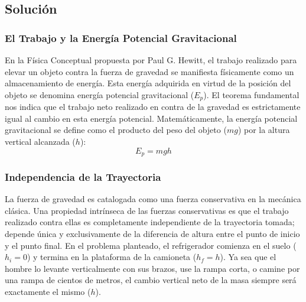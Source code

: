 \documentclass[a4paper,12pt]{article}
\begin{document}
\begin{center}
\end{center}

\subsection*{Solución}

\subsubsection*{El Trabajo y la Energía Potencial Gravitacional}
En la Física Conceptual propuesta por Paul G. Hewitt, el trabajo realizado para elevar un objeto contra la fuerza de gravedad se manifiesta físicamente como un almacenamiento de energía. Esta energía adquirida en virtud de la posición del objeto se denomina energía potencial gravitacional ($E_p$). El teorema fundamental nos indica que el trabajo neto realizado en contra de la gravedad es estrictamente igual al cambio en esta energía potencial. 
Matemáticamente, la energía potencial gravitacional se define como el producto del peso del objeto ($mg$) por la altura vertical alcanzada ($h$):
$$E_p = mgh$$

\subsubsection*{Independencia de la Trayectoria}
La fuerza de gravedad es catalogada como una fuerza conservativa en la mecánica clásica. Una propiedad intrínseca de las fuerzas conservativas es que el trabajo realizado contra ellas es completamente independiente de la trayectoria tomada; depende única y exclusivamente de la diferencia de altura entre el punto de inicio y el punto final. 
En el problema planteado, el refrigerador comienza en el suelo ($h_i = 0$) y termina en la plataforma de la camioneta ($h_f = h$). Ya sea que el hombre lo levante verticalmente con sus brazos, use la rampa corta, o camine por una rampa de cientos de metros, el cambio vertical neto de la masa siempre será exactamente el mismo ($h$).
\end{document}
